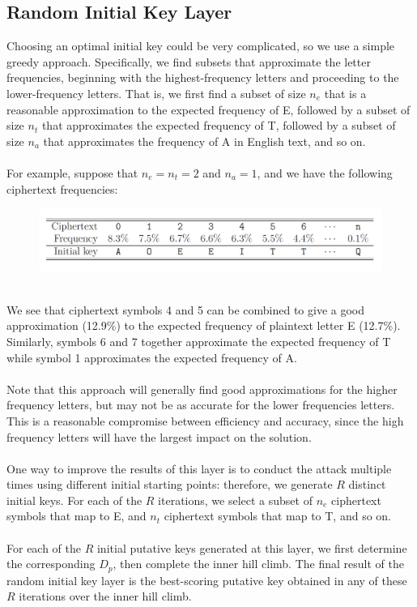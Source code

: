 \documentclass[Lau,binding=0.6cm,oneside]{sapthesis}
\begin{document}
\subsection{Random Initial Key Layer}
Choosing an optimal initial key could be very complicated, so we use a simple greedy approach. Specifically, we find subsets that approximate the letter frequencies, beginning with the highest-frequency letters and proceeding to the lower-frequency letters. That is, we first find a subset of size $n_e$ that is a reasonable approximation to the expected frequency of \textsf{E}, followed by a subset of size $n_t$ that approximates the expected frequency of \textsf{T}, followed by a subset of size $n_a$ that approximates the frequency of \textsf{A} in English text, and so on.\\\\
For example, suppose that $n_e = n_t = 2$ and $n_a = 1$, and we have the following ciphertext frequencies:
\begin{figure}[H]
\includegraphics[scale=0.27]{random_key_layer}
\centering
\caption{}
\centering
\end{figure}
\ \\
We see that ciphertext symbols \textsf{4} and \textsf{5} can be combined to give a good approximation (12.9\%) to the expected frequency of plaintext letter \textsf{E} (12.7\%). Similarly, symbols \textsf{6} and \textsf{7} together approximate the expected frequency of \textsf{T} while symbol \textsf{1} approximates the expected frequency of \textsf{A}.\\\\
Note that this approach will generally find good approximations for the higher frequency letters, but may not be as accurate for the lower frequencies letters. This is a reasonable compromise between efficiency and accuracy, since the high frequency letters will have the largest impact on the solution.\\\\
One way to improve the results of this layer is to conduct the attack multiple times using different initial starting points: therefore, we generate $R$ distinct initial keys. For each of the $R$ iterations, we select a subset of $n_e$ ciphertext symbols that map to \textsf{E}, and $n_t$ ciphertext symbols that map to \textsf{T}, and so on.\\\\
For each of the $R$ initial putative keys generated at this layer, we first determine the corresponding $D_p$, then complete the inner hill climb. The final result of the random initial key layer is the best-scoring putative key obtained in any of these $R$ iterations over the inner hill climb.\\
\end{document}
